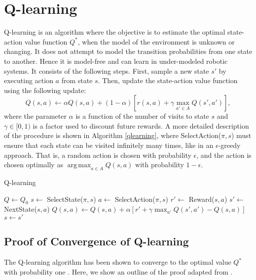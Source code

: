 \documentclass{article} %
\DeclareMathOperator*{\argmax}{arg\,max}
\begin{document}
\section{Q-learning}
Q-learning is an algorithm where the objective is to estimate the optimal state-action value function $Q^*$, when the model of the environment is unknown or changing. It does not attempt to model the transition probabilities from one state to another.  Hence it is model-free and can learn in under-modeled robotic systems.  It consists of the following steps.  First, sample a new state $s'$ by executing action $a$ from state $s$.  Then, update the state-action value function using the following update:
$$Q(s,a) \leftarrow \alpha Q(s,a) + (1-\alpha)[r(s,a) + \gamma \max_{a' \in A}Q(s', a')],$$
where the parameter $\alpha$ is a function of the number of visits to state $s$ and $\gamma \in [0,1)$ is a factor used to discount future rewards.  A more detailed description of the procedure is shown in Algorithm \ref{qlearning}, where SelectAction($\pi,s$) must ensure that each state can be visited infinitely many times, like in an $\epsilon$-greedy approach.  That is, a random action is chosen with probability $\epsilon$, and the action is chosen optimally as $\argmax_{a\in A} Q(s,a)$ with probability $1-\epsilon$.
\begin{algorithm}
 \caption{Q-learning}\label{euclid}
  \begin{algorithmic}[1]
      \State $Q\gets Q_0$
        \State $s \gets $ SelectState($\pi,s$)
        	\State $a \gets$ SelectAction($\pi,s$)
        	\State $r' \gets$ Reward($s,a$)
        	\State $s' \gets$ NextState($s,a$)
        	\State $Q(s,a) \gets Q(s,a) + \alpha[r' + \gamma\max_{a'}Q(s',a')-Q(s,a)]$
        	\State $s \gets s'$
        \EndFor
      \EndFor
      \State {}
    \EndProcedure
  \end{algorithmic}
  \label{qlearning}
\end{algorithm}

\subsection{Proof of Convergence of Q-learning}
The Q-learning algorithm has been shown to converge to the optimal value $Q^*$ with probability one \cite{watkins}.  Here, we show an outline of the proof adapted from \cite{mohri}.  
\end{document}
